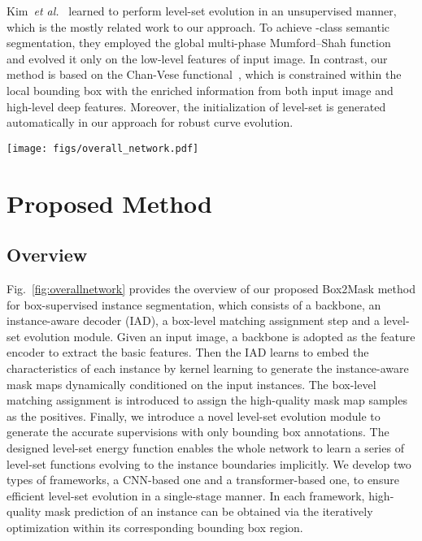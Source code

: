 \documentclass[12pt,onecolumn,letterpaper]{article}
\begin{document}
Kim~\textit{et al.}~\cite{tip2019mumford} learned to perform level-set evolution in an unsupervised manner, which is the mostly related work to our approach. To achieve -class semantic segmentation, they employed the global multi-phase Mumford–Shah function~\cite{mumford1989optimal} and evolved it only on the low-level features of input image. In contrast, our method is based on the Chan-Vese functional~\cite{tip2001_active_contour}, which is constrained within the local bounding box with the enriched information from both input image and high-level deep features. Moreover, the initialization of level-set is generated automatically in our approach for robust curve evolution.


\begin{figure*}[t]
	\centering
	\texttt{[image: figs/overall\_network.pdf]}
	\caption{\textbf{Overall framework of Box2Mask.} 
		Our proposed Box2Mask is a single-stage method for box-supervised instance segmentation. It consists of a backbone, an instance-aware decoder (IAD), a box-level matching assignment step and a level-set evolution module. The backbone is adopted as the feature encoder to extract basic features.
		The IAD generates the instance-aware mask maps  of full image size.   
		Only the positive mask maps of  will perform level-set evolution within the corresponding bounding box region . 
		With iterative energy minimization, accurate instance segmentation can be obtained with box annotations only. The category branch is omitted here for the convenience of illustration.}
	\label{fig:overallnetwork}
\end{figure*}

\section{Proposed Method}

\subsection{Overview}
Fig.~\ref{fig:overallnetwork} provides the overview of our proposed Box2Mask method for box-supervised instance segmentation, which consists of a backbone, an instance-aware decoder (IAD), a box-level matching assignment step and a level-set evolution module.
Given an input image, a backbone is adopted as the feature encoder to extract the basic features.
Then the IAD learns to embed the characteristics of each instance by kernel learning to generate the instance-aware mask maps dynamically conditioned on the input instances. 
The box-level matching assignment is introduced to assign the high-quality mask map samples as the positives. Finally, we introduce a novel level-set evolution module to generate the accurate supervisions  with only bounding box annotations.
The designed level-set energy function enables the whole network to learn a series of level-set functions evolving to the instance boundaries implicitly.
We develop two types of frameworks, a CNN-based one and a transformer-based one, to ensure efficient level-set evolution in a single-stage manner. In each framework, high-quality mask prediction of an instance can be obtained via the iteratively optimization within its corresponding bounding box region.
\end{document}
